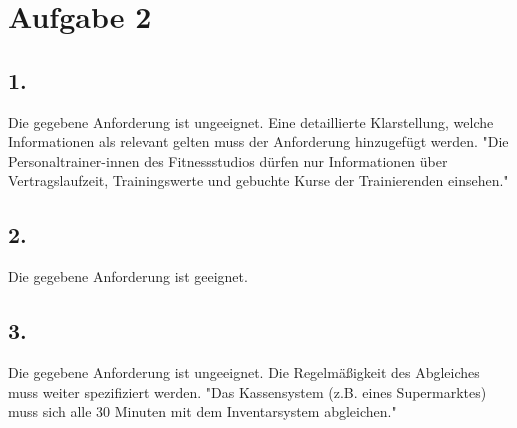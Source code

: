 \chapter*{Aufgabe 2}
\section*{1.}
    Die gegebene Anforderung ist ungeeignet. Eine detaillierte Klarstellung, welche Informationen als relevant gelten muss der Anforderung hinzugefügt werden.
    "Die Personaltrainer-innen des Fitnessstudios dürfen nur Informationen über Vertragslaufzeit, Trainingswerte und gebuchte Kurse der Trainierenden
    einsehen."
\section*{2.}
    Die gegebene Anforderung ist geeignet.
\section*{3.}
   Die gegebene Anforderung ist ungeeignet. Die Regelmäßigkeit des Abgleiches muss weiter spezifiziert werden.
   "Das Kassensystem (z.B. eines Supermarktes) muss sich alle 30 Minuten mit dem Inventarsystem abgleichen."